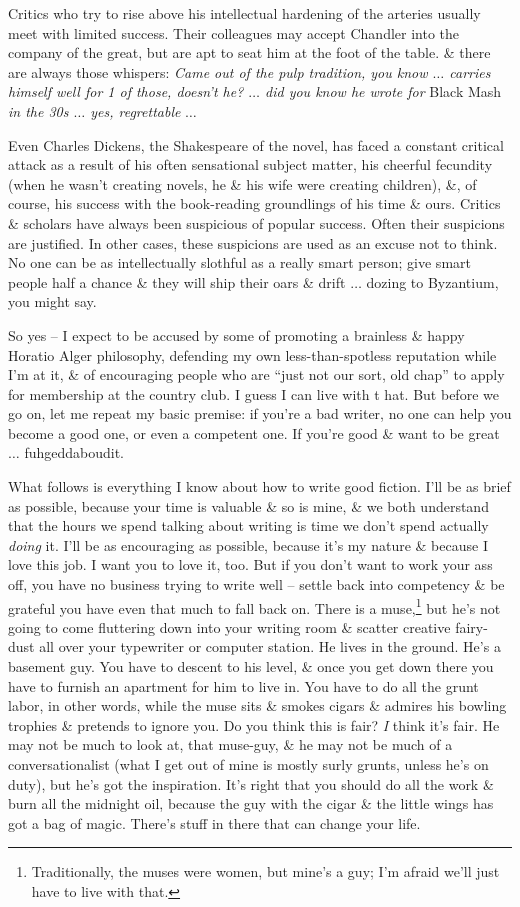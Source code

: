\documentclass{article}
\numberwithin{equation}{section}
\begin{document}
Critics who try to rise above his intellectual hardening of the arteries usually meet with limited success. Their colleagues may accept Chandler into the company of the great, but are apt to seat him at the foot of the table. \& there are always those whispers: \textit{Came out of the pulp tradition, you know $\ldots$ carries himself well for 1 of those, doesn't he? $\ldots$ did you know he wrote for} Black Mash \textit{in the 30s $\ldots$ yes, regrettable} $\ldots$

Even Charles Dickens, the Shakespeare of the novel, has faced a constant critical attack as a result of his often sensational subject matter, his cheerful fecundity (when he wasn't creating novels, he \& his wife were creating children), \&, of course, his success with the book-reading groundlings of his time \& ours. Critics \& scholars have always been suspicious of popular success. Often their suspicions are justified. In other cases, these suspicions are used as an excuse not to think. No one can be as intellectually slothful as a really smart person; give smart people half a chance \& they will ship their oars \& drift $\ldots$ dozing to Byzantium, you might say.

So yes -- I expect to be accused by some of promoting a brainless \& happy Horatio Alger philosophy, defending my own less-than-spotless reputation while I'm at it, \& of encouraging people who are ``just not our sort, old chap'' to apply for membership at the country club. I guess I can live with t hat. But before we go on, let me repeat my basic premise: if you're a bad writer, no one can help you become a good one, or even a competent one. If you're good \& want to be great $\ldots$ fuhgeddaboudit.

What follows is everything I know about how to write good fiction. I'll be as brief as possible, because your time is valuable \& so is mine, \& we both understand that the hours we spend talking about writing is time we don't spend actually \textit{doing} it. I'll be as encouraging as possible, because it's my nature \& because I love this job. I want you to love it, too. But if you don't want to work your ass off, you have no business trying to write well -- settle back into competency \& be grateful you have even that much to fall back on. There is a muse,\footnote{Traditionally, the muses were women, but mine's a guy; I'm afraid we'll just have to live with that.} but he's not going to come fluttering down into your writing room \& scatter creative fairy-dust all over your typewriter or computer station. He lives in the ground. He's a basement guy. You have to descent to his level, \& once you get down there you have to furnish an apartment for him to live in. You have to do all the grunt labor, in other words, while the muse sits \& smokes cigars \& admires his bowling trophies \& pretends to ignore you. Do you think this is fair? \textit{I} think it's fair. He may not be much to look at, that muse-guy, \& he may not be much of a conversationalist (what I get out of mine is mostly surly grunts, unless he's on duty), but he's got the inspiration. It's right that you should do all the work \& burn all the midnight oil, because the guy with the cigar \& the little wings has got a bag of magic. There's stuff in there that can change your life.
\end{document}
